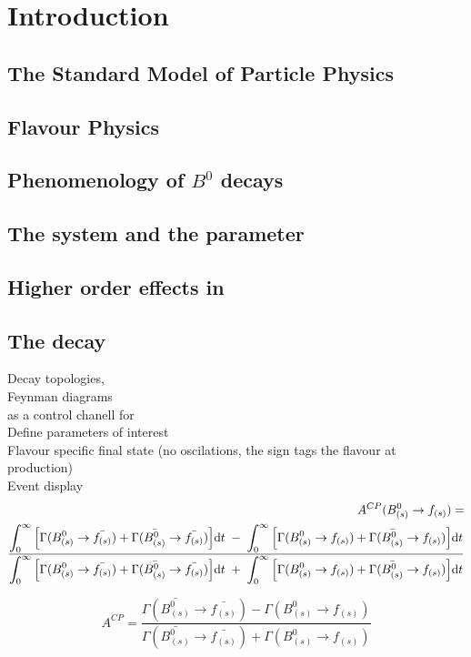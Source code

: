 
\chapter{Introduction}
\label{Introduction}


\section{The Standard Model of Particle Physics}

\section{Flavour Physics}

\section{Phenomenology of $B^0$ decays}

\section{The \Bs system and the \phis parameter}

\section{Higher order effects in \phis}

\section{The \BsJpsiKst decay}
\label{TheBsJpsiKstDecay}
Decay topologies,\\
Feynman diagrams \\
\BsJpsiKst as a control chanell for \phis \\
Define parameters of interest\\
Flavour specific final state (no oscilations, the sign tags the flavour at production) \\

Event display \\


{\small
\begin{eqnarray}
A^{CP} (B^0_{(s)} \to f_{(s)})  = &  \nonumber \\
\frac{ \displaystyle \int_0^\infty \Big[ \Gamma(B^0_{(s)} \to \bar{f_{(s)}}) + \Gamma(\bar{B^0_{(s)}} \to \bar{f_{(s)}}) \Big]
{\rm d}t \;-\; \int_0^\infty \Big[ \Gamma(B^0_{(s)} \to f_{(s)}) + \Gamma(\bar{B^0_{(s)}} \to f_{(s)}) \Big]
{\rm d}t}{ \displaystyle \int_0^\infty \Big[ \Gamma(B^0_{(s)} \to \bar{f_{(s)}}) + \Gamma(\bar{B^0_{(s)}} \to \bar{f_{(s)}}) \Big] {\rm d}t
 \;+\; \int_0^\infty \Big[ \Gamma(B^0_{(s)} \to f_{(s)}) + \Gamma(\bar{B^0_{(s)}} \to f_{(s)}) \Big] {\rm d}t}  & 
\label{decayrates}
\end{eqnarray}
 }

\begin{equation}
A^{CP} = \frac{\Gamma(\bar{B^0_{(s)}} \to \bar{f_{(s)}})-\Gamma(B^0_{(s)} \to f_{(s)})}{\Gamma(\bar{B^0_{(s)}} \to \bar{f_{(s)}})+ \Gamma(B^0_{(s)} \to f_{(s)})}
\end{equation}

